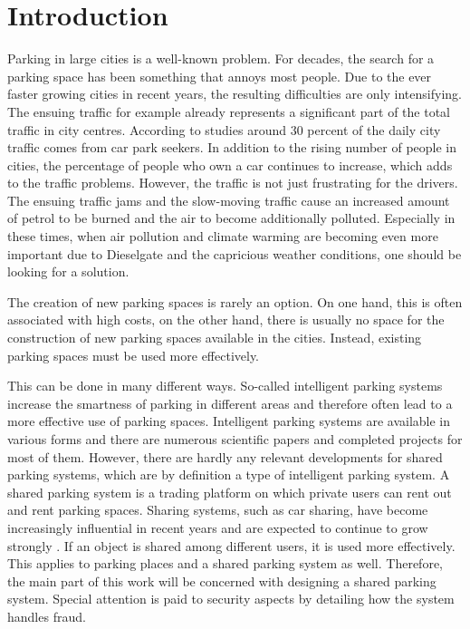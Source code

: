 \chapter{Introduction}
\label{ch:Introduction}
Parking in large cities is a well-known problem. For decades, the search for a parking space has been something that annoys most people. Due to the ever faster growing cities in recent years, the resulting difficulties are only intensifying. The ensuing traffic for example already represents a significant part of the total traffic in city centres. According to studies around 30 percent of the daily city traffic comes from car park seekers\cite{shoup2006cruising}. In addition to the rising number of people in cities, the percentage of people who own a car continues to increase, which adds to the traffic problems. However, the traffic is not just frustrating for the drivers. The ensuing traffic jams and the slow-moving traffic cause an increased amount of petrol to be burned and the air to become additionally polluted. Especially in these times, when air pollution and climate warming are becoming even more important due to Dieselgate and the capricious weather conditions, one should be looking for a solution.

The creation of new parking spaces is rarely an option. On one hand, this is often associated with high costs, on the other hand, there is usually no space for the construction of new parking spaces available in the cities. Instead, existing parking spaces must be used more effectively.

This can be done in many different ways. So-called intelligent parking systems increase the smartness of parking in different areas and therefore often lead to a more effective use of parking spaces. Intelligent parking systems are available in various forms and there are numerous scientific papers and completed projects for most of them. However, there are hardly any relevant developments for shared parking systems, which are by definition a type of intelligent parking system. A shared parking system is a trading platform on which private users can rent out and rent parking spaces. Sharing systems, such as car sharing, have become increasingly influential in recent years and are expected to continue to grow strongly \cite{freese2014shared}. If an object is shared among different users, it is used more effectively. This applies to parking places and a shared parking system as well. Therefore, the main part of this work will be concerned with designing a shared parking system. Special attention is paid to security aspects by detailing how the system handles fraud.

